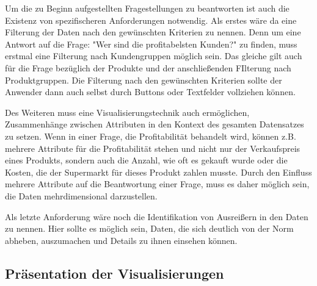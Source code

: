 \documentclass[usegeometry=true]{scrartcl}
\begin{document}
\noindent Um die zu Beginn aufgestellten Fragestellungen zu beantworten ist auch die Existenz von spezifischeren Anforderungen notwendig. Als erstes wäre da eine Filterung der
Daten nach den gewünschten Kriterien zu nennen. Denn um eine Antwort auf die Frage: "Wer sind die profitabelsten Kunden?" zu finden, muss erstmal eine Filterung nach Kundengruppen
möglich sein. Das gleiche gilt auch für die Frage bezüglich der Produkte und der anschließenden FIlterung nach Produktgruppen. Die Filterung nach den gewünschten Kriterien
sollte der Anwender dann auch selbst durch Buttons oder Textfelder vollziehen können.

\noindent Des Weiteren muss eine Visualisierungstechnik auch ermöglichen, Zusammenhänge zwischen Attributen in den Kontext des gesamten Datensatzes zu setzen. Wenn in einer Frage,
die Profitabilität behandelt wird, können z.B. mehrere Attribute für die Profitabilität stehen und nicht nur der Verkaufspreis eines Produkts, sondern auch die
Anzahl, wie oft es gekauft wurde oder die Kosten, die der Supermarkt für dieses Produkt zahlen musste. Durch den Einfluss mehrere Attribute auf die Beantwortung einer Frage, muss
es daher möglich sein, die Daten mehrdimensional darzustellen.

\noindent Als letzte Anforderung wäre noch die Identifikation von Ausreißern in den Daten zu nennen. Hier sollte es möglich sein, Daten, die sich deutlich von der Norm abheben,
auszumachen und Details zu ihnen einsehen können.

\subsection{Präsentation der Visualisierungen}
\end{document}
